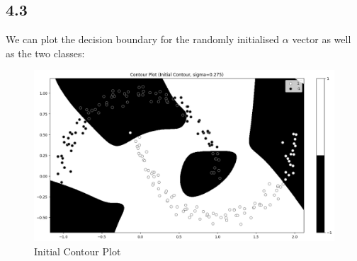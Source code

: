 \documentclass[12pt]{article}
\begin{document}
\subsection*{4.3}

We can plot the decision boundary for the randomly initialised $\alpha$ vector as well as the two classes:
\begin{figure}[h]
\centering
\includegraphics[scale=0.28]{outputs/part_4/initial-contour}
\caption{Initial Contour Plot}
\label{fig:}
\end{figure}
\end{document}
